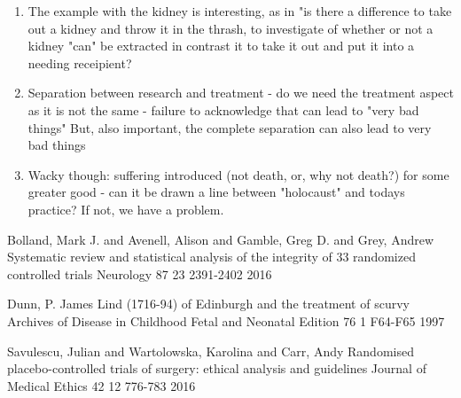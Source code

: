 \documentclass[12p]{article}
\begin{document}
\begin{enumerate}

\item
  The example with the kidney is interesting, as in "is there a difference to take out a kidney 
  and throw it in the thrash, to investigate of whether or not a kidney "can" be extracted in contrast
  it to take it out and put it into a needing receipient?
\item
  Separation between research and treatment - do we need the treatment aspect as it is not the same - failure to acknowledge that can lead to "very bad things"
  But, also important, the complete separation can also lead to very bad things
\item
  Wacky though: suffering introduced (not death, or, why not death?) for some greater good - can it be drawn a line between "holocaust" and todays practice? 
  If not, we have a problem.
  
  \end{enumerate}

\begin{thebibliography}{9}

Bolland, Mark J. and Avenell, Alison and Gamble, Greg D. and Grey, Andrew
Systematic review and statistical analysis of the integrity of 33 randomized controlled trials
Neurology
87
23
2391-2402
2016

Dunn, P.
James Lind (1716-94) of Edinburgh and the treatment of scurvy
Archives of Disease in Childhood Fetal and Neonatal Edition
76
1
F64-F65
1997

Savulescu, Julian and Wartolowska, Karolina and Carr, Andy
Randomised placebo-controlled trials of surgery: ethical analysis and guidelines
Journal of Medical Ethics
42
12
776-783
2016

\end{thebibliography}
 
\end{document}

